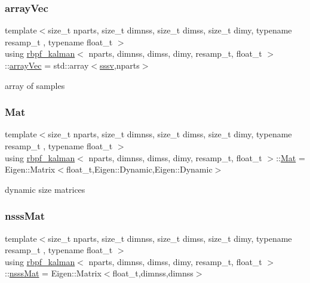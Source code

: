 \subsubsection{\texorpdfstring{array\+Vec}{arrayVec}}
{\footnotesize\ttfamily template$<$size\+\_\+t nparts, size\+\_\+t dimnss, size\+\_\+t dimss, size\+\_\+t dimy, typename resamp\+\_\+t , typename float\+\_\+t $>$ \\
using \hyperlink{classrbpf__kalman}{rbpf\+\_\+kalman}$<$ nparts, dimnss, dimss, dimy, resamp\+\_\+t, float\+\_\+t $>$\+::\hyperlink{classrbpf__kalman_ad0c2ef4db6363157244741517daae136}{array\+Vec} =  std\+::array$<$\hyperlink{classrbpf__kalman_a616e56c08c1a6b476e065b2200433915}{sssv},nparts$>$}

array of samples \mbox{\label{classrbpf__kalman_a736704f31949e04f537aa8b7263e44af}} 
\subsubsection{\texorpdfstring{Mat}{Mat}}
{\footnotesize\ttfamily template$<$size\+\_\+t nparts, size\+\_\+t dimnss, size\+\_\+t dimss, size\+\_\+t dimy, typename resamp\+\_\+t , typename float\+\_\+t $>$ \\
using \hyperlink{classrbpf__kalman}{rbpf\+\_\+kalman}$<$ nparts, dimnss, dimss, dimy, resamp\+\_\+t, float\+\_\+t $>$\+::\hyperlink{classrbpf__kalman_a736704f31949e04f537aa8b7263e44af}{Mat} =  Eigen\+::\+Matrix$<$float\+\_\+t,Eigen\+::\+Dynamic,Eigen\+::\+Dynamic$>$}

dynamic size matrices \mbox{\label{classrbpf__kalman_afb337a9e8f4048c0eae2971ea61f96d5}} 
\subsubsection{\texorpdfstring{nsss\+Mat}{nsssMat}}
{\footnotesize\ttfamily template$<$size\+\_\+t nparts, size\+\_\+t dimnss, size\+\_\+t dimss, size\+\_\+t dimy, typename resamp\+\_\+t , typename float\+\_\+t $>$ \\
using \hyperlink{classrbpf__kalman}{rbpf\+\_\+kalman}$<$ nparts, dimnss, dimss, dimy, resamp\+\_\+t, float\+\_\+t $>$\+::\hyperlink{classrbpf__kalman_afb337a9e8f4048c0eae2971ea61f96d5}{nsss\+Mat} =  Eigen\+::\+Matrix$<$float\+\_\+t,dimnss,dimnss$>$}

